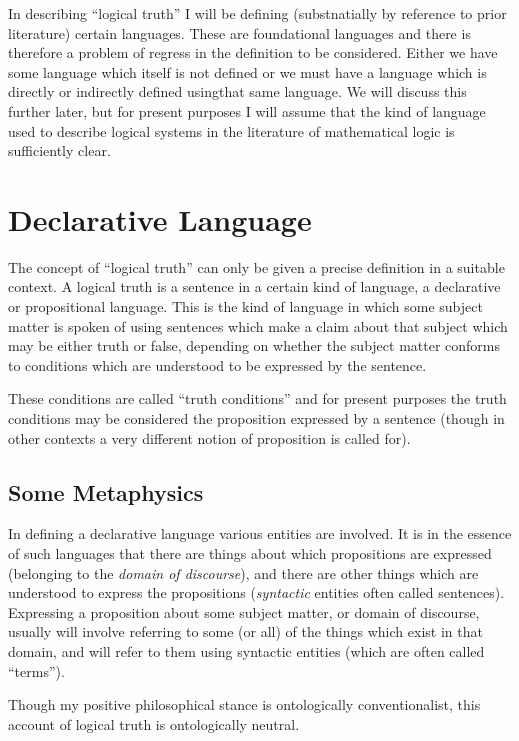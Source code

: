 \documentclass[10pt,titlepage]{book}
\begin{document}
In describing ``logical truth'' I will be defining (substnatially by reference to prior literature) certain languages.
These are foundational languages and there is therefore a problem of regress in the definition to be considered.
Either we have some language which itself is not defined or we must have a language which is directly or indirectly defined usingthat same language.
We will discuss this further later, but for present purposes I will assume that the kind of language used to describe logical systems in the literature of mathematical logic is sufficiently clear.

\section{Declarative Language}

The concept of ``logical truth'' can only be given a precise definition in a suitable context.
A logical truth is a sentence in a certain kind of language, a declarative or propositional language.
This is the kind of language in which some subject matter is spoken of using sentences which make a claim about that subject which may be either truth or false, depending on whether the subject matter conforms to conditions which are understood to be expressed by the sentence.

These conditions are called ``truth conditions'' and for present purposes the truth conditions may be considered the proposition expressed by a sentence (though in other contexts a very different notion of proposition is called for).

\subsection{Some Metaphysics}

In defining a declarative language various entities are involved.
It is in the essence of such languages that there are things about which propositions are expressed (belonging to the \emph{domain of discourse}), and there are other things which are understood to express the propositions (\emph{syntactic} entities often called sentences).
Expressing a proposition about some subject matter, or domain of discourse, usually will involve referring to some (or all) of the things which exist in that domain, and will refer to them using syntactic entities (which are often called ``terms'').

Though my positive philosophical stance is ontologically conventionalist, this account of logical truth is ontologically neutral.
\end{document}
